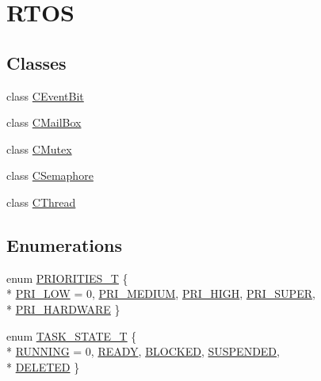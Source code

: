 \hypertarget{group___r_t_o_s}{\section{R\-T\-O\-S}
\label{group___r_t_o_s}
}
\subsection*{Classes}
\begin{DoxyCompactItemize}
\item 
class \hyperlink{class_c_event_bit}{C\-Event\-Bit}
\item 
class \hyperlink{class_c_mail_box}{C\-Mail\-Box}
\item 
class \hyperlink{class_c_mutex}{C\-Mutex}
\item 
class \hyperlink{class_c_semaphore}{C\-Semaphore}
\item 
class \hyperlink{class_c_thread}{C\-Thread}
\end{DoxyCompactItemize}
\subsection*{Enumerations}
\begin{DoxyCompactItemize}
\item 
enum \hyperlink{group___r_t_o_s_ga51e24e4c0498282f564e92975e020c1d}{P\-R\-I\-O\-R\-I\-T\-I\-E\-S\-\_\-\-T} \{ \\*
\hyperlink{group___r_t_o_s_gga51e24e4c0498282f564e92975e020c1daf8a2513dc9a78bb09c0520af65a3f402}{P\-R\-I\-\_\-\-L\-O\-W} = 0, 
\hyperlink{group___r_t_o_s_gga51e24e4c0498282f564e92975e020c1da79f9a58f2b2fb4dcce4589cd93a5e3f8}{P\-R\-I\-\_\-\-M\-E\-D\-I\-U\-M}, 
\hyperlink{group___r_t_o_s_gga51e24e4c0498282f564e92975e020c1dae366c91784dd520e388c90d0e3770b2b}{P\-R\-I\-\_\-\-H\-I\-G\-H}, 
\hyperlink{group___r_t_o_s_gga51e24e4c0498282f564e92975e020c1dae497885a7abaca97e8daf75b84bb67da}{P\-R\-I\-\_\-\-S\-U\-P\-E\-R}, 
\\*
\hyperlink{group___r_t_o_s_gga51e24e4c0498282f564e92975e020c1da47d8cd9e6c142378614cf48f5ecd78e5}{P\-R\-I\-\_\-\-H\-A\-R\-D\-W\-A\-R\-E}
 \}
\item 
enum \hyperlink{group___r_t_o_s_ga25ee4013cc565a18ac2f4039b4ad441b}{T\-A\-S\-K\-\_\-\-S\-T\-A\-T\-E\-\_\-\-T} \{ \\*
\hyperlink{group___r_t_o_s_gga25ee4013cc565a18ac2f4039b4ad441ba1061be6c3fb88d32829cba6f6b2be304}{R\-U\-N\-N\-I\-N\-G} = 0, 
\hyperlink{group___r_t_o_s_gga25ee4013cc565a18ac2f4039b4ad441ba6564f2f3e15be06b670547bbcaaf0798}{R\-E\-A\-D\-Y}, 
\hyperlink{group___r_t_o_s_gga25ee4013cc565a18ac2f4039b4ad441ba376c1b6a3f75d283a2efacf737438d61}{B\-L\-O\-C\-K\-E\-D}, 
\hyperlink{group___r_t_o_s_gga25ee4013cc565a18ac2f4039b4ad441ba1c2114335a42993ac5cc5dbf65f83d41}{S\-U\-S\-P\-E\-N\-D\-E\-D}, 
\\*
\hyperlink{group___r_t_o_s_gga25ee4013cc565a18ac2f4039b4ad441baae88752b9379248f07e2c3fdc064d998}{D\-E\-L\-E\-T\-E\-D}
 \}
\end{DoxyCompactItemize}


